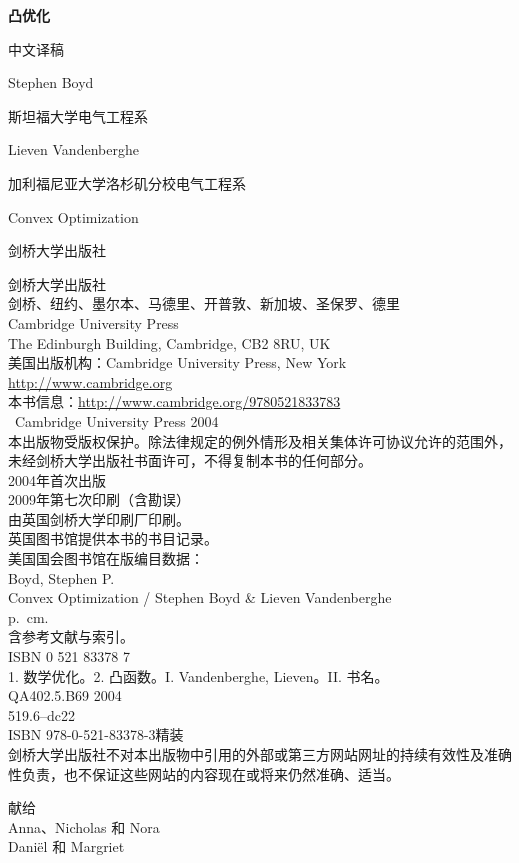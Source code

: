 \begin{titlepage}
\centering
\vspace*{2cm}
{\Huge\bfseries 凸优化\par}
\vspace{.35cm}
{\large 中文译稿\par}
\vspace{.65cm}
{\Large Stephen Boyd\par}
{\normalsize 斯坦福大学电气工程系\par}
\vspace{.6cm}
{\Large Lieven Vandenberghe\par}
{\normalsize 加利福尼亚大学洛杉矶分校电气工程系\par}
\vfill
{\large Convex Optimization\par}
{\normalsize 剑桥大学出版社\par}
\end{titlepage}
\thispagestyle{empty}
\noindent 剑桥大学出版社\\
剑桥、纽约、墨尔本、马德里、开普敦、新加坡、圣保罗、德里\\[1em]
Cambridge University Press\\
The Edinburgh Building, Cambridge, CB2 8RU, UK\\
美国出版机构：Cambridge University Press, New York\\
\url{http://www.cambridge.org}\\
本书信息：\url{http://www.cambridge.org/9780521833783}\\[1em]
\textcopyright\ Cambridge University Press 2004\\[1em]
本出版物受版权保护。除法律规定的例外情形及相关集体许可协议允许的范围外，未经剑桥大学出版社书面许可，不得复制本书的任何部分。\\[1em]
2004年首次出版\\
2009年第七次印刷（含勘误）\\
由英国剑桥大学印刷厂印刷。\\[1em]
英国图书馆提供本书的书目记录。\\[1em]
美国国会图书馆在版编目数据：\\
Boyd, Stephen P.\\
Convex Optimization / Stephen Boyd \& Lieven Vandenberghe\\
p.\ cm.\\
含参考文献与索引。\\
ISBN 0 521 83378 7\\
1. 数学优化。2. 凸函数。I. Vandenberghe, Lieven。II. 书名。\\
QA402.5.B69 2004\\
519.6--dc22\\[1em]
ISBN 978-0-521-83378-3\quad 精装\\[1em]
剑桥大学出版社不对本出版物中引用的外部或第三方网站网址的持续有效性及准确性负责，也不保证这些网站的内容现在或将来仍然准确、适当。
\cleardoublepage
\thispagestyle{empty}
\vspace*{4cm}
\begin{center}
献给\\[1em]
Anna、Nicholas 和 Nora\\[.5em]
Dani\"el 和 Margriet
\end{center}
\cleardoublepage
